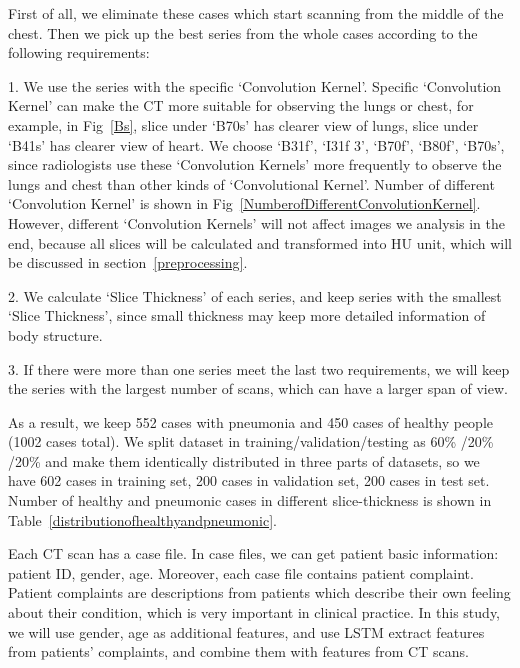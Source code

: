 \documentclass[runningheads]{llncs}
\begin{document}
First of all, we eliminate these cases which start scanning from the middle of the chest. Then we pick up the best series from the whole cases according to the following requirements:

1. We use the series with the specific `Convolution Kernel'. Specific `Convolution Kernel' can make the CT more suitable for observing the lungs or chest, for example, in Fig~\ref{Bs}, slice under `B70s' has clearer view of lungs, slice under `B41s' has clearer view of heart. We choose `B31f', `I31f 3', `B70f', `B80f', `B70s', since  radiologists use these `Convolution Kernels'  more frequently to observe the lungs and chest than other kinds of `Convolutional Kernel'. Number of different `Convolution Kernel' is shown in Fig~\ref{NumberofDifferentConvolutionKernel}. However, different `Convolution Kernels' will not affect images we analysis in the end, because all slices will be calculated and transformed into HU unit, which will be discussed in section~\ref{preprocessing}.

2. We calculate `Slice Thickness' of each series, and keep series with the smallest `Slice Thickness', since small thickness may keep more detailed information of body structure. 

3. If there were more than one series meet the last two requirements, we will keep the series with the largest number of scans, which can have a larger span of view.

As a result, we keep 552 cases with pneumonia and 450 cases of healthy people (1002 cases total).
We split dataset in training/validation/testing as 60\% /20\% /20\% and make them identically distributed in three parts of datasets, so we have 602 cases in training set, 200 cases in validation set, 200 cases in test set.
Number of healthy and pneumonic cases in different slice-thickness is shown in Table~\ref{distributionofhealthyandpneumonic}.

Each CT scan has a case file. In case files, we can get patient basic information: patient ID, gender, age. Moreover, each case file contains patient complaint. Patient complaints are descriptions from patients which describe their own feeling about their condition, which is very important in clinical practice. In this study, we will use gender, age as additional features, and use LSTM extract features from patients' complaints, and combine them with features from CT scans.
\end{document}
